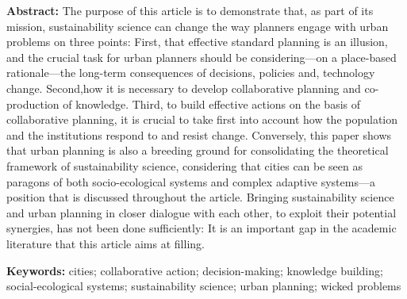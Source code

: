 \documentclass[10pt,a4paper]{article}
\begin{document}
\textbf{{\color{LibrelloColor}Abstract:}} The purpose of this article is to demonstrate that, as part of its mission, sustainability science can change the way planners engage with urban problems on three points: First, that effective standard planning is an illusion, and the crucial task for urban planners should be considering---on a place-based rationale---the long-term consequences of decisions, policies and, technology change. Second,how it is necessary to develop collaborative planning and co-production of knowledge. Third, to build effective actions on the basis of collaborative planning, it is crucial to take first into account how the population and the institutions respond to and resist change. Conversely, this paper shows that urban planning is also a breeding ground for consolidating the theoretical framework of sustainability science, considering that cities can be seen as paragons of both socio-ecological systems and complex adaptive systems---a position that is discussed throughout the article. Bringing sustainability science and urban planning in closer dialogue with each other, to exploit their potential synergies, has not been done sufficiently: It is an important gap in the academic literature that this article aims at filling. 

\textbf{{\color{LibrelloColor}Keywords:}} cities; collaborative action; decision-making; knowledge building; social-ecological systems; sustainability science; urban planning; wicked problems
\par\endgroup
 
\setlength{\parindent}{0.5cm}
\setlength{\parskip}{0cm}
\setlength{\bibsep}{0cm}

\vspace*{10mm}
\end{document}
